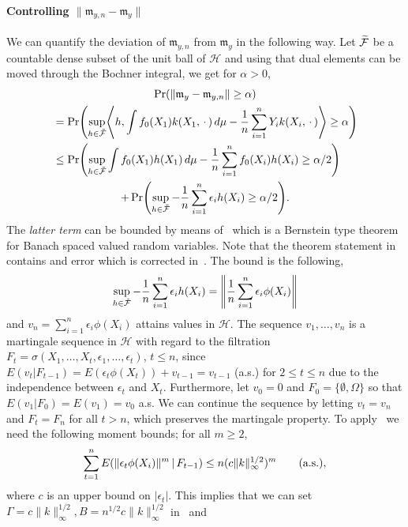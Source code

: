 \documentclass[AHL,Unicode,longabstracts,published]{cedram}
\theoremstyle{remark}
\newcommand{\cH}{\mathcal{H}}
\newcommand{\clF}{\mathcal{F}}
\newcommand{\mean}{\mathfrak{m}}
\let\oldtilde\tilde
\renewcommand*{\tilde}[1]{\mathchoice{\widetilde{#1}}{\widetilde{#1}}{\oldtilde{#1}}{\oldtilde{#1}}}
\let\originalleft\left
\let\originalright\right
\renewcommand{\left}{\mathopen{}\mathclose\bgroup\originalleft}
\renewcommand{\right}{\aftergroup\egroup\originalright}
\begin{document}
\paragraph{Controlling $\|\mean_{y,n} - \mean_y\|$} We can quantify the deviation of $\mean_{y,n}$ from $\mean_y$ in the following way. Let $\tilde{\clF}$ be a countable dense subset of the unit ball of $\cH$ and using that dual elements can be moved through the Bochner integral, we get for $\alpha>0$,
\begin{multline}\label{eq:mean_y_n_vs_y}
\Pr(\| \mean_y - \mean_{y,n}\| \geq \alpha)  \\
\begin{aligned}
&= \Pr\left(\sup_{h \in \tilde{\clF}} \left\langle h, \int f_0(X_1) k(X_1,\,\cdot\,) \, d\mu - \frac{1}{n} \sum_{i=1}^n Y_i k(X_i,\,\cdot\,) \right\rangle \geq \alpha \right)  \\
&\leq \Pr\left(\sup_{h \in \tilde{\clF}} \int f_0(X_1) h(X_1) \, d\mu - \frac{1}{n} \sum_{i=1}^n f_0(X_i) h(X_i) \geq \alpha/2\right) 
\end{aligned}\\
+ \Pr\left(\sup_{h \in \tilde{\clF}} - \frac{1}{n} \sum_{i=1}^n \epsilon_i h(X_i) \geq \alpha/2 \right).
\end{multline}
The \emph{latter term} can be bounded by means of~\cite[Theorem~3.3]{PIN94} which is a Bernstein type theorem for Banach spaced valued random variables. Note that the theorem statement in~\cite{PIN94} contains and error which is corrected in~\cite{PIN99}. The bound is the following,
\[
\sup_{h \in \tilde{\clF}} - \frac{1}{n} \sum_{i=1}^n \epsilon_i h(X_i) =
\left\|\frac{1}{n} \sum_{i=1}^n \epsilon_i \phi(X_i)\right\|
\]
and $v_n = \sum_{i=1}^n \epsilon_i \phi(X_i)$ attains values in $\cH$. The sequence $v_1,\dots, v_n$ is a martingale sequence in $\cH$ with regard to the filtration $F_t = \sigma(X_1,\dots,X_t,\epsilon_1,\dots, \epsilon_t)$, $t \leq n$, since $E(v_t |F_{t-1}) = E(\epsilon_t \phi(X_t)) + v_{t-1} = v_{t-1}$ (a.s.) for $2\leq t\leq n$ due to the independence between $\epsilon_t$ and $X_t$. Furthermore, let $v_0 = 0$ and $F_0 = \{\emptyset,\Omega\}$ so that $E(v_1 | F_0) = E(v_1) = v_0$ a.s. We can continue the sequence by letting $v_t = v_n$ and $F_t = F_n$ for all $t> n$, which preserves the martingale property. To apply~\cite[Theorem~3.3]{PIN94,PIN99} we need the following moment bounds; for all $m\geq 2$,
\[
\sum_{t=1}^n E\left(\|\epsilon_t \phi(X_i) \|^m \,\middle|\,F_{t-1}\right) \leq n (c \|k\|^{1/2}_\infty)^m \text{\quad\quad(a.s.)},
\]
where $c$ is an upper bound on $|\epsilon_t|$. This implies that we can set $\Gamma =c \|k\|^{1/2}_\infty, B= n^{1/2} c \|k\|^{1/2}_\infty$ in~\cite[Theorem~3.3]{PIN94,PIN99} and
\end{document}
